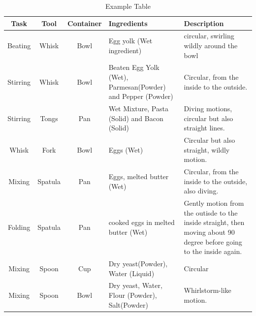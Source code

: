     \begin{table}[H]
        \centering
        \begin{tabular}{|c|c|c|p{}|p{}|}
            \hline
            \textbf{Task} & \textbf{Tool} & \textbf{Container} & \textbf{Ingredients} & \textbf{Description} \\
            \hline
            Beating & Whisk & Bowl & Egg yolk (Wet ingredient) & circular, swirling wildly around the bowl \\
            \hline
            Stirring & Whisk & Bowl & Beaten Egg Yolk (Wet), Parmesan(Powder) and Pepper (Powder) & Circular, from the inside to the outside. \\
            \hline
            Stirring & Tongs & Pan & Wet Mixture, Pasta (Solid) and Bacon (Solid) & Diving motions, circular but also straight lines. \\
            \hline
            Whisk & Fork & Bowl & Eggs (Wet) & Circular but also straight, wildly motion. \\
            \hline
            Mixing & Spatula & Pan & Eggs, melted butter (Wet) & Circular, from the inside to the outside, also diving. \\
            \hline
            Folding & Spatula & Pan & cooked eggs in melted butter (Wet) & Gently motion from the outisde to the inside straight, then moving about 90 degree before going to the inside again. \\
            \hline
            Mixing & Spoon & Cup & Dry yeast(Powder), Water (Liquid) & Circular \\
            \hline
            Mixing & Spoon & Bowl & Dry yeast, Water, Flour (Powder), Salt(Powder) & Whirlstorm-like motion. \\
            \hline 
        \end{tabular}
        \caption{Example Table}
        \label{tab:example}
      \end{table}
      

